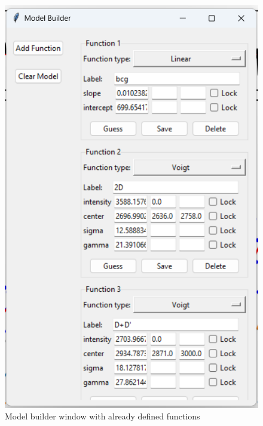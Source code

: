 \begin{figure}[H]
    \centering
    \includegraphics[width=0.5\linewidth]{Resources/model_builder.png}
    \caption{Model builder window with already defined functions}
    \label{model_builder}
\end{figure}


